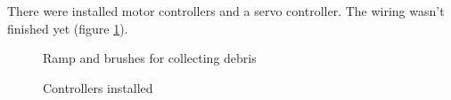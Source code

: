 There were installed motor controllers and a servo controller. The wiring wasn't finished yet (figure \ref{Controllers1.3}).

\begin{figure}[H]
	\begin{minipage}[h]{0.47\linewidth}
		\caption{Ramp and brushes for collecting debris}
		\label{Gripper2.2}
	\end{minipage}
	\hfill
	\begin{minipage}[h]{0.47\linewidth}
		\caption{Controllers installed}
		\label{Controllers1.3}
	\end{minipage}
\end{figure}
